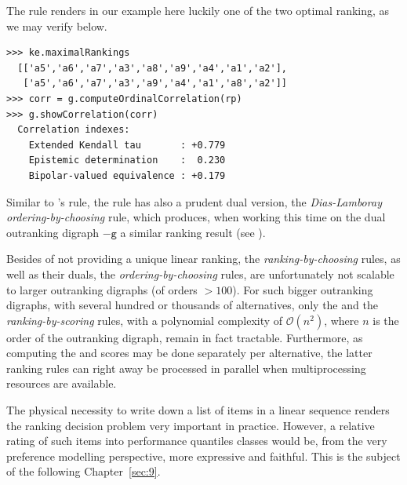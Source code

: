 The \RankedPairs rule renders in our example here luckily one of the two optimal \Kemeny ranking, as we may verify below.
 \begin{lstlisting}
>>> ke.maximalRankings
  [['a5','a6','a7','a3','a8','a9','a4','a1','a2'],
   ['a5','a6','a7','a3','a9','a4','a1','a8','a2']]
>>> corr = g.computeOrdinalCorrelation(rp)
>>> g.showCorrelation(corr)
  Correlation indexes:
    Extended Kendall tau       : +0.779
    Epistemic determination    :  0.230
    Bipolar-valued equivalence : +0.179
\end{lstlisting}

Similar to \Kohler 's rule, the \RankedPairs rule has also a prudent dual version, the \emph{Dias-Lamboray} \emph{ordering-by-choosing} rule, which produces, when working this time on the dual outranking digraph $-\mathtt{g}$ a similar ranking result (see \citealp*{LAM-2009,DIA-2010}).

Besides of not providing a unique linear ranking, the \emph{ranking-by-choosing} rules, as well as their duals, the \emph{ordering-by-choosing} rules, are unfortunately not scalable to larger outranking digraphs (of orders $> 100$). For such bigger outranking digraphs, with several hundred or thousands of alternatives, only the \Copeland and the \NetFlows \emph{ranking-by-scoring} rules, with a polynomial complexity of $\mathcal{O}(n^2)$, where $n$ is the order of the outranking digraph, remain in fact tractable. Furthermore, as computing the \Copeland and \NetFlows scores may be done separately per alternative, the latter ranking rules can right away be processed in parallel when multiprocessing resources are available.

\vspace{\baselineskip}
The physical necessity to write down a list of items in a linear sequence renders the ranking decision problem very important in practice. However, a relative rating of such items into performance quantiles classes would be, from the very preference modelling perspective, more expressive and faithful. This is the subject of the following Chapter~\ref{sec:9}.


%



